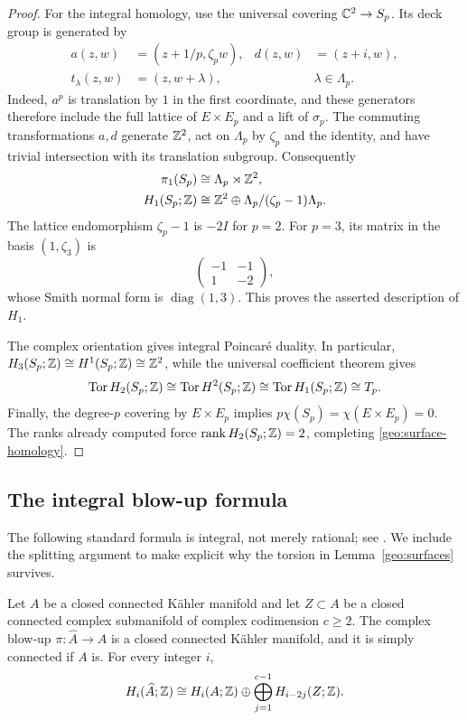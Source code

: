 \begin{proof}
For the integral homology, use the universal covering $\mathbb C^2\to S_p$.
Its deck group is generated by
\[
 \begin{aligned}
 a(z,w)&=(z+1/p,\zeta_p w),&d(z,w)&=(z+i,w),\\
 t_\lambda(z,w)&=(z,w+\lambda),&&\lambda\in\Lambda_p.
 \end{aligned}
\]
Indeed, $a^p$ is translation by $1$ in the first coordinate, and these
generators therefore include the full lattice of $E\times E_p$ and
a lift of $\sigma_p$. The commuting transformations $a,d$ generate
$\mathbb Z^2$, act on $\Lambda_p$ by $\zeta_p$ and the identity, and have
trivial intersection with its translation subgroup. Consequently
\[
 \begin{aligned}
 \pi_1(S_p)&\cong\Lambda_p\rtimes\mathbb Z^2,\\
 H_1(S_p;\mathbb Z)&\cong
 \mathbb Z^2\oplus\Lambda_p/(\zeta_p-1)\Lambda_p.
 \end{aligned}
\]
The lattice endomorphism $\zeta_p-1$ is $-2I$ for $p=2$. For $p=3$,
its matrix in the basis $(1,\zeta_3)$ is
\[
 \begin{pmatrix}-1&-1\\1&-2\end{pmatrix},
\]
whose Smith normal form is $\operatorname{diag}(1,3)$. This proves the
asserted description of $H_1$.

The complex orientation gives integral Poincar\'e duality. In
particular, $H_3(S_p;\mathbb Z)\cong H^1(S_p;\mathbb Z)\cong\mathbb Z^2$, while the
universal coefficient theorem gives
\[
 \operatorname{Tor} H_2(S_p;\mathbb Z)\cong\operatorname{Tor} H^2(S_p;\mathbb Z)
 \cong\operatorname{Tor} H_1(S_p;\mathbb Z)\cong T_p.
\]
Finally, the degree-$p$ covering by $E\times E_p$ implies
$p\chi(S_p)=\chi(E\times E_p)=0$. The ranks already computed force
$\operatorname{rank} H_2(S_p;\mathbb Z)=2$, completing
\eqref{geo:surface-homology}.
\end{proof}

\subsection{The integral blow-up formula}

The following standard formula is integral, not merely rational; see
\cite[Theorem~4.1]{DuanLi2009}. We include the splitting argument to
make explicit why the torsion in Lemma~\ref{geo:surfaces} survives.

\begin{proposition}
\label{geo:blowup}
Let $A$ be a closed connected K\"ahler manifold and let $Z\subset A$
be a closed connected complex submanifold of complex codimension
$c\geq2$. The complex blow-up $\pi:\widehat A\to A$ is a closed
connected K\"ahler manifold, and it is simply connected if $A$ is.
For every integer $i$,
\begin{equation}
\label{geo:blowup-homology}
 H_i(\widehat A;\mathbb Z)\cong
 H_i(A;\mathbb Z)\oplus\bigoplus_{j=1}^{c-1}H_{i-2j}(Z;\mathbb Z).
\end{equation}
\end{proposition}

